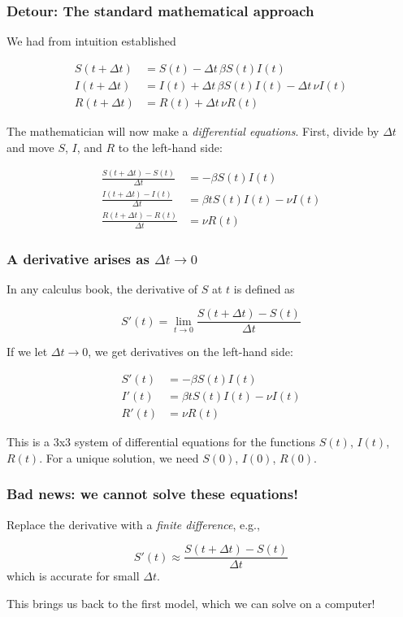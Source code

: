 \documentclass{beamer}
\newenvironment{block_mdfboxadmon}[1][]{\begin{block}{#1}}{\end{block}}
\begin{document}
\begin{frame}
\frametitle{Detour: The standard mathematical approach}

We had from intuition established

\begin{align*}
S(t+\Delta t) &= S(t) - \Delta t\,\beta S(t)I(t)\\
I(t+\Delta t) &= I(t) + \Delta t\,\beta S(t)I(t) -\Delta t\,\nu I(t)\\
R(t+\Delta t) &= R(t) + \Delta t\,\nu R(t)
\end{align*}

The mathematician will now make a \emph{differential equations}. First,
divide by $\Delta t$ and move $S$, $I$, and $R$ to the left-hand side:

\begin{align*}
\frac{S(t+\Delta t) - S(t)}{\Delta t} &= - \beta S(t)I(t)\\
\frac{I(t+\Delta t) - I(t)}{\Delta t} &= \beta t S(t)I(t) -\nu I(t)\\
\frac{R(t+\Delta t) - R(t)}{\Delta t} &= \nu R(t)
\end{align*}
\end{frame}

\begin{frame}
\frametitle{A derivative arises as $\Delta t\rightarrow 0$}

In any calculus book, the derivative of $S$ at $t$ is defined as

\[ S'(t) = \lim_{t\rightarrow 0}\frac{S(t+\Delta t) - S(t)}{\Delta t}\]

If we let $\Delta t\rightarrow 0$, we get derivatives on the left-hand side:

\begin{align*}
S'(t) &= - \beta S(t)I(t)\\
I'(t) &= \beta t S(t)I(t) -\nu I(t)\\
R'(t) &= \nu R(t)
\end{align*}

This is a 3x3 system of differential equations for the functions
$S(t)$, $I(t)$, $R(t)$. For a unique solution, we need
$S(0)$, $I(0)$, $R(0)$.
\end{frame}

\begin{frame}
\frametitle{Bad news: we cannot solve these equations!}

\begin{block_mdfboxadmon}
Replace the derivative with a \emph{finite difference}, e.g.,

\[ S'(t) \approx \frac{S(t+\Delta t) - S(t)}{\Delta t}\]
which is accurate for small $\Delta t$.
\end{block_mdfboxadmon}



This brings us back to the first model, which we can solve
on a computer!
\end{frame}
\end{document}
